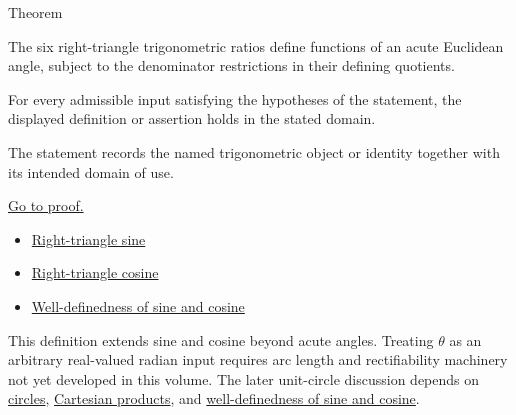 

\begin{theorembox}{Theorem}
\begin{theorem}
\label{thm:six-trig-functions}
The six right-triangle trigonometric ratios define functions of an acute
Euclidean angle, subject to the denominator restrictions in their defining
quotients.
\end{theorem}
\end{theorembox}
\begin{remark*}
For every admissible input satisfying the hypotheses of the statement, the
displayed definition or assertion holds in the stated domain.
\end{remark*}

\begin{remark*}[Interpretation]
The statement records the named trigonometric object or identity together with
its intended domain of use.
\end{remark*}

\begin{remark*}[Proof]
\hyperref[prf:six-trig-functions]{Go to proof.}
\end{remark*}
\begin{dependencies}
\begin{itemize}
  \item \hyperref[def:right-triangle-sine]{Right-triangle sine}
  \item \hyperref[def:right-triangle-cosine]{Right-triangle cosine}
  \item \hyperref[thm:sine-cosine-well-defined]{Well-definedness of sine and cosine}
\end{itemize}
\end{dependencies}

\begin{remark*}
This definition extends sine and cosine beyond acute angles. Treating
$\theta$ as an arbitrary real-valued radian input requires arc length and
rectifiability machinery not yet developed in this volume. The later
unit-circle discussion depends on
\hyperref[def:euclid-circle]{circles},
\hyperref[def:cartesian-product]{Cartesian products}, and
\hyperref[thm:sine-cosine-well-defined]{well-definedness of sine and cosine}.
\end{remark*}




